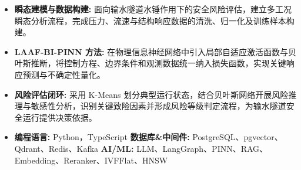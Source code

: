 \begin{itemize}[itemsep=0.5ex, parsep=0ex]
    \item \textbf{瞬态建模与数据构建:} 面向输水隧道水锤作用下的安全风险评估，建立多工况瞬态分析流程，完成压力、流速与结构响应数据的清洗、归一化及训练样本构建。
    \item \textbf{LAAF-BI-PINN 方法:} 在物理信息神经网络中引入局部自适应激活函数与贝叶斯推断，将控制方程、边界条件和观测数据统一纳入损失函数，实现关键响应预测与不确定性量化。
    \item \textbf{风险评估闭环:} 采用 K-Means 划分典型运行状态，结合贝叶斯网络开展风险推理与敏感性分析，识别关键致险因素并形成风险等级判定流程，为输水隧道安全运行提供决策依据。
\end{itemize}

\begin{itemize}[parsep=0ex, itemsep=0ex, leftmargin=*]
    \item \textbf{编程语言:} Python，TypeScript \quad \textbf{数据库\&中间件:} PostgreSQL、pgvector、Qdrant、Redis、Kafka \quad \textbf{AI/ML:} LLM、LangGraph、PINN、RAG、Embedding、Reranker、IVFFlat、HNSW 
\end{itemize}
